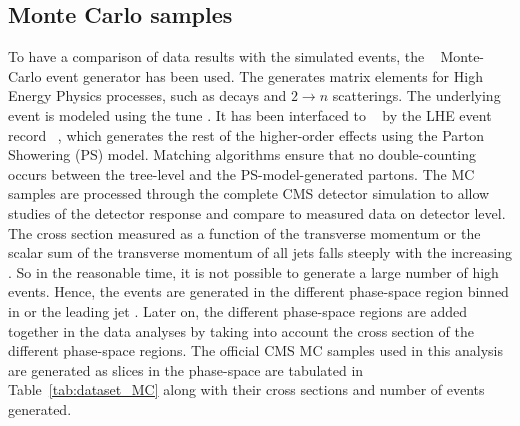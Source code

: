 \subsection{Monte Carlo samples}
To have a comparison of data results with the simulated events, the \MadGraphF~\cite{Alwall:2011uj} Monte-Carlo event generator has been 
used. The \MadGraphF generates matrix elements for High Energy Physics processes, such as decays and $2 \rightarrow n$ scatterings. The 
underlying event is modeled using the tune \Ztwostar. It has been interfaced to \PYTHIAS~\cite{Sjostrand:2006za} by the LHE event record~
\cite{Alwall:2006yp}, which generates the rest of the higher-order effects using the Parton Showering (PS) model. Matching algorithms 
ensure that no double-counting occurs between the tree-level and the PS-model-generated partons. The MC samples are processed through the 
complete CMS detector simulation to allow studies of the detector response and compare to measured data on detector level.\\
The cross section measured as a function of the transverse momentum \pt or the scalar sum of the transverse momentum of all jets \HT falls 
steeply with the increasing \pt. So in the reasonable time, it is not possible to generate a large number of high \pt events. Hence, the 
events are generated in the different phase-space region binned in \HT or the leading jet \pt. Later on, the different phase-space regions 
are added together in the data analyses by taking into account the cross section of the different phase-space regions. The official CMS 
\MadGraphF \plus \PYTHIAS MC samples used in this analysis are generated as slices in the \HT phase-space are tabulated in Table~\ref{tab:dataset_MC} along with their cross sections and number of events generated.\\
